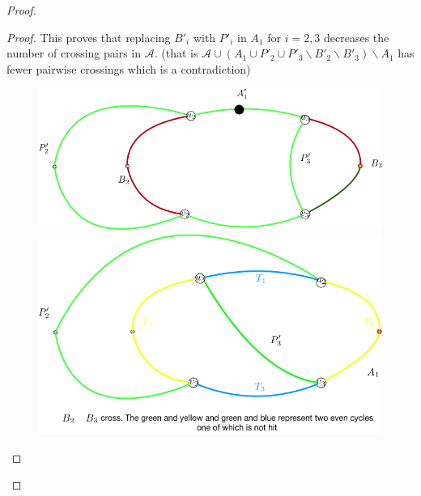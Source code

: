 \documentclass[letterpaper,11pt]{article}
\newcommand{\0}{\mathbb{0}}
\newcommand{\1}{\mathbb{1}}
\begin{document}
\begin{proof}
\begin{proof}
This proves that replacing $B'_i$ %
with $P'_i$ in $A_1$ for $i=2,3$ decreases the number of crossing pairs in $\mathcal{A}$. (that is $\mathcal{A} \cup (A_1 \cup P'_2 \cup P'_3 \backslash B'_2 \backslash B'_3 ) \backslash A_1  $ has fewer pairwise crossings which is a contradiction)
\begin{figure}
    \centering
    \includegraphics[scale=0.3]{DisjointP_iCont}
     \includegraphics[scale=0.3]{DisjointP_icross.png}

\end{figure}
\end{proof}
\end{proof}
\end{document}
